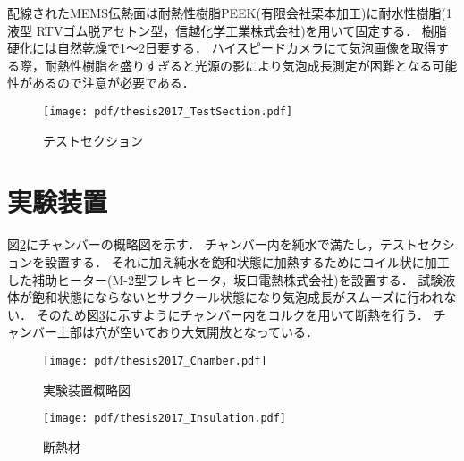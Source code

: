 配線されたMEMS伝熱面は耐熱性樹脂PEEK(有限会社栗本加工)に耐水性樹脂(1液型 RTVゴム脱アセトン型，信越化学工業株式会社)を用いて固定する．
樹脂硬化には自然乾燥で1〜2日要する．
ハイスピードカメラにて気泡画像を取得する際，耐熱性樹脂を盛りすぎると光源の影により気泡成長測定が困難となる可能性があるので注意が必要である．
\begin{figure}[ht]
\vspace{0zh}
\begin{center}
  \texttt{[image: pdf/thesis2017\_TestSection.pdf]}
  \vspace{0zh}
  \caption{テストセクション}\label{TestSection}
 \end{center}
 \vspace{-0.5zh}
\end{figure}
\clearpage


\section{実験装置}
図\ref{Chamber}にチャンバーの概略図を示す．
チャンバー内を純水で満たし，テストセクションを設置する．
それに加え純水を飽和状態に加熱するためにコイル状に加工した補助ヒーター(M-2型フレキヒータ，坂口電熱株式会社)を設置する．
試験液体が飽和状態にならないとサブクール状態になり気泡成長がスムーズに行われない．
そのため図\ref{Insulation}に示すようにチャンバー内をコルクを用いて断熱を行う．
チャンバー上部は穴が空いており大気開放となっている．


\begin{figure}[ht]
\vspace{0zh}
\begin{center}
  \texttt{[image: pdf/thesis2017\_Chamber.pdf]}
  \vspace{-2zh}
  \caption{実験装置概略図}\label{Chamber}
 \end{center}
 \vspace{-0.5zh}
\end{figure}
\clearpage

\begin{figure}[ht]
\vspace{-0.5zh}
\begin{center}
  \texttt{[image: pdf/thesis2017\_Insulation.pdf]}
  \vspace{0zh}
  \caption{断熱材}\label{Insulation}
 \end{center}
 \vspace{-0.5zh}
\end{figure}

